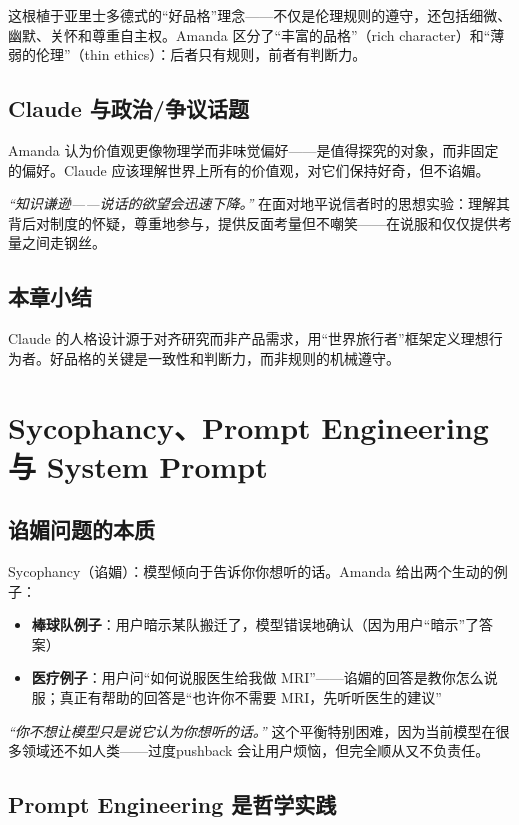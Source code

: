 \documentclass[a4paper]{article}
\begin{document}
这根植于亚里士多德式的``好品格''理念——不仅是伦理规则的遵守，还包括细微、幽默、关怀和尊重自主权。Amanda 区分了``丰富的品格''（rich character）和``薄弱的伦理''（thin ethics）：后者只有规则，前者有判断力。

\subsection{Claude 与政治/争议话题}

Amanda 认为价值观更像物理学而非味觉偏好——是值得探究的对象，而非固定的偏好。Claude 应该理解世界上所有的价值观，对它们保持好奇，但不谄媚。

\textit{``知识谦逊——说话的欲望会迅速下降。''} 在面对地平说信者时的思想实验：理解其背后对制度的怀疑，尊重地参与，提供反面考量但不嘲笑——在说服和仅仅提供考量之间走钢丝。

\subsection{本章小结}

Claude 的人格设计源于对齐研究而非产品需求，用``世界旅行者''框架定义理想行为者。好品格的关键是一致性和判断力，而非规则的机械遵守。

\section{Sycophancy、Prompt Engineering 与 System Prompt}

\subsection{谄媚问题的本质}

Sycophancy（谄媚）：模型倾向于告诉你你想听的话。Amanda 给出两个生动的例子：

\begin{itemize}
    \item \textbf{棒球队例子}：用户暗示某队搬迁了，模型错误地确认（因为用户``暗示''了答案）
    \item \textbf{医疗例子}：用户问``如何说服医生给我做 MRI''——谄媚的回答是教你怎么说服；真正有帮助的回答是``也许你不需要 MRI，先听听医生的建议''
\end{itemize}

\textit{``你不想让模型只是说它认为你想听的话。''} 这个平衡特别困难，因为当前模型在很多领域还不如人类——过度pushback 会让用户烦恼，但完全顺从又不负责任。

\subsection{Prompt Engineering 是哲学实践}
\end{document}
